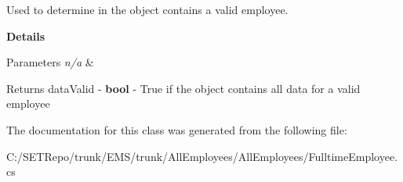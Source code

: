 Used to determine in the object contains a valid employee. 

{\bfseries Details}


\begin{DoxyParams}{Parameters}
{\em n/a} & \\
\hline
\end{DoxyParams}
\begin{DoxyReturn}{Returns}
data\+Valid -\/ {\bfseries bool} -\/ True if the object contains all data for a valid employee 
\end{DoxyReturn}


The documentation for this class was generated from the following file\+:\begin{DoxyCompactItemize}
\item 
C\+:/\+S\+E\+T\+Repo/trunk/\+E\+M\+S/trunk/\+All\+Employees/\+All\+Employees/Fulltime\+Employee.\+cs\end{DoxyCompactItemize}
